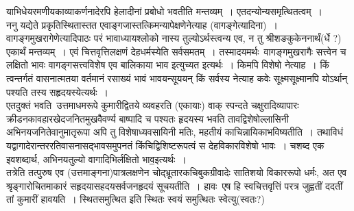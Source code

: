 \documentclass[11pt, openany]{book}
\begin{document}
\newpage

\begin{quote}
 { }
\end{quote}

\noindent
याभिधेयरमणीयकाव्याकर्णनादेरपि हेलादीनां प्रबोधो भवतीति मन्तव्यम्~। एतदन्योन्यसमृत्थितत्वम्~। \\

ननु यद्येते प्रकृतिस्थितास्तत एवाङ्गजास्तत्किमन्यापेक्षणेनेत्याह (वागङ्गेत्यादिना)~। वागङ्गमुखरागेणेत्यादिपाठः परं भावाध्यायश्लोको नास्य तुल्योऽर्थस्त्वन्य एव, न तु श्रीशङकुकेननार्थं(र्धे ?) एकार्थं मन्तव्यम्~। एवं चित्तवृत्तिलक्षणं देहधर्मस्येति सर्वसमतम्~। तस्मादयमर्थः\textendash\ वागङ्गमुखरागैः सत्त्वेन च लक्षितो भावः वागङ्गसत्त्वविशेष एव बालिकाया भाव इत्युच्यत इत्यर्थः~। किमपि विशेषो नेत्याह~। किं त्वन्तर्गतं वासनात्मतया वर्तमानं रसाख्यं भावं भावयन्सूययन् किं सर्वस्य नेत्याह कवेः सूक्ष्मसूक्ष्मानपि योऽर्थान् पश्यति तस्य सहृदयस्येत्यर्थः~। \\

एतदुक्तं भवति\textendash\ उत्तमाधमरूपे कुमारीद्वितये व्यवहरति (एकायाः) वाक् स्पन्दते चक्षुरादिव्यापारः क्रीडनकावहारखेदजनितमुखवैवर्ण्य बाष्पादि च पश्यतः हृदयस्य भवति तावद्विशेषोल्लासिनी अभिनयजनितेवानुमातृरूपा अपि तु विशेषाध्यवसायिनी मतिः, महतीयं काचिन्नायिकाभविष्यतीति~। तथाविधं यद्वागादेरान्तररतिवासनासद्भावसमुपनतं किंचिद्विशिष्टरूपत्वं स देहविकारविशेषो भावः~। चशब्द एक इवशब्दार्थ, अभिनयतुल्यो वागादिभिर्लक्षितो भाव॒इत्यर्थः~।\\

तत्रेति तत्पुरुष एव (उत्तमाङ्गना)पात्रलक्षणेन चोद्भ्रूतारकचिबुकग्रीवादेः सातिशयो विकाररूपो धर्मः, अत एव श्रृङ्गारोचितमाकारं सहृदयासहदयसर्वजनहृदयं सूचयतीति~। हावः\textendash\ एष हि स्वचित्तवृत्तिं परत्र जुह्वतीं ददतीं तां कुमारीं हावयति~। स्थितसमुत्थित इति स्थितः स्वयं समुत्थितः स्वेत्यु(स्वतः?) 
\end{document}
